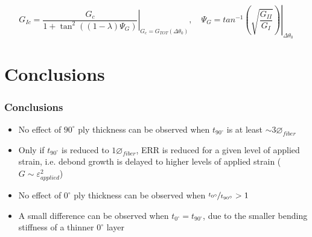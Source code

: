 \documentclass[first,firstsupp,lastsupp,last,hyperref,table]{ETHclass}
\begin{document}
\begin{frame}
\begin{columns}[c]
\begin{column}{0.5\textwidth}
\begin{figure}
\end{figure}
\end{column}
\end{columns}
\vspace{-0.2cm}
\scriptsize
\begin{equation*}
G_{Ic}=\left.\frac{G_{c}}{1+\tan^{2}\left(\left(1-\lambda\right)\Psi_{G}\right)}\right|_{G_{c}=G_{TOT}\left(\Delta\theta_{0}\right)},\quad\Psi_{G}=\left.tan^{-1}\left(\sqrt{\frac{G_{II}}{G_{I}}}\right)\right|_{\Delta\theta_{0}}
\end{equation*}
\end{frame}

\section{Conclusions}

\begin{frame}
\frametitle{Conclusions}
\vspace{-0.5cm}
\centering
\begin{itemize}[label=]
\item No effect of  $90^{\circ}$ ply thickness can be observed when $t_{90^{\circ}}$ is at least $\sim3\diameter_{fiber}$
\item Only if $t_{90^{\circ}}$ is reduced to $1\diameter_{fiber}$, ERR is reduced for a given level of applied strain, i.e. debond growth is delayed to higher levels of applied strain ($G\sim\varepsilon_{applied}^{2}$)
\item No effect of  $0^{\circ}$ ply thickness can be observed when $\nicefrac{t_{0^{\circ}}}{t_{90^{\circ}}}>1$
\item A small difference can be observed when  $t_{0^{\circ}}=t_{90^{\circ}}$, due to the smaller bending stiffness of a thinner $0^{\circ}$ layer
\end{itemize}
\end{frame}

\begin{frame}[plain]
\frametitle{}
\end{frame}
\end{document}
